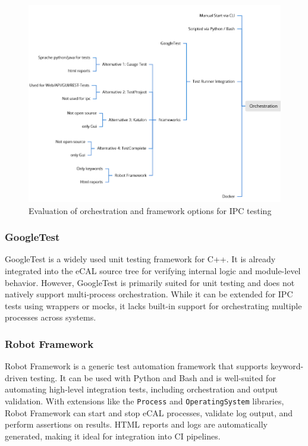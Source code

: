 \begin{figure}[H]
	\centering
	\includegraphics[width=\textwidth]{Images/mm_04_orchestration.png}
	\caption{Evaluation of orchestration and framework options for IPC testing}
	\label{fig:mm_orchestration}
\end{figure}

\subsubsection*{GoogleTest}

GoogleTest is a widely used unit testing framework for C++. It is already integrated into the eCAL source tree for verifying internal logic and module-level behavior. However, GoogleTest is primarily suited for unit testing and does not natively support multi-process orchestration. While it can be extended for IPC tests using wrappers or mocks, it lacks built-in support for orchestrating multiple processes across systems.

\subsubsection*{Robot Framework}

Robot Framework is a generic test automation framework that supports keyword-driven testing. It can be used with Python and Bash and is well-suited for automating high-level integration tests, including orchestration and output validation. With extensions like the \texttt{Process} and \texttt{OperatingSystem} libraries, Robot Framework can start and stop eCAL processes, validate log output, and perform assertions on results. HTML reports and logs are automatically generated, making it ideal for integration into CI pipelines.

